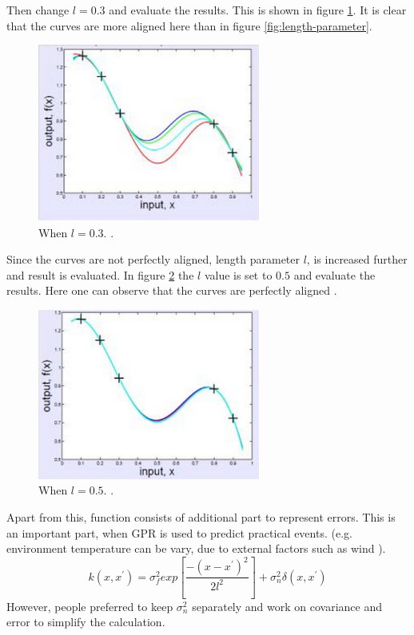 Then change $l=0.3$ and evaluate the results. This is shown in figure \ref{fig:length-parameter-03}. It is clear that the curves are more aligned here than in figure \ref{fig:length-parameter}.
\begin{figure}[here]
  \centering
      \includegraphics[width=0.65\textwidth]{theory/graphics/effects-of-l-03.png}
  \caption{When $l = 0.3$. \cite{length-parameter}. }
  \label{fig:length-parameter-03}
\end{figure}
Since the curves are not perfectly aligned, length parameter $l$, is increased further and result is evaluated. In figure \ref{fig:length-parameter-05} the $l$ value is set to $0.5$ and evaluate the results. Here one can observe that the curves are perfectly aligned \cite{length-parameter}.
\begin{figure}[here]
  \centering
      \includegraphics[width=0.65\textwidth]{theory/graphics/effects-of-l-05.png}
  \caption{When $l = 0.5$. \cite{length-parameter}. }
  \label{fig:length-parameter-05}
\end{figure}
Apart from this, function consists of additional part to represent errors. This is an important part, when GPR is used to predict practical events. (e.g. environment temperature can be vary, due to external factors such as wind ).
\begin{equation}
k(x,x^{'})=\sigma_{f}^{2}exp\left[ \dfrac{-(x-x^{'})^{2}}{2l^{2}} \right] + \sigma_{n}^{2}\delta(x,x^{'})
\label{eq:referanceName}
\end{equation}
However, people preferred to keep $ \sigma_{n}^{2} $ separately and work on covariance and error to simplify the calculation.

